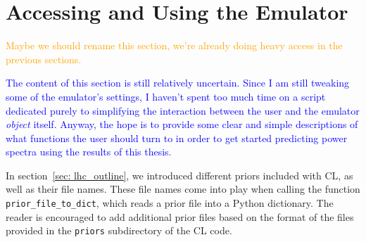 \section{Accessing and Using the Emulator}


\textcolor{orange}{Maybe we should rename this section, we're already doing
heavy access in the previous sections.}

\textcolor{blue}{The content of this section is still relatively uncertain. 
Since I am still tweaking some of the emulator's settings, I haven't spent too 
much time on a script dedicated purely to simplifying the interaction between 
the user and the emulator \textit{object} itself. Anyway, the hope is to 
provide some clear and simple 
descriptions of what functions the user should turn to in order to get started 
predicting power spectra using the results of this thesis.}


In section~\ref{sec: lhc_outline}, we introduced different priors 
included with CL, as well as their file names. These file names come into play 
when calling the function \verb|prior_file_to_dict|, which reads a prior file
into a Python dictionary. The reader is encouraged to add additional prior
files based on the format of the files provided in the \verb|priors|
subdirectory of the CL code.

